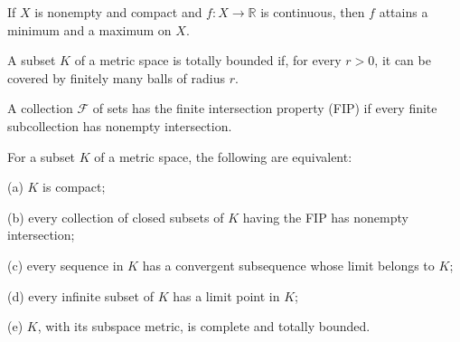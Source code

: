 \begin{cor}
If $X$ is nonempty and compact and $f:X\to\mathbb{R}$ is continuous,
then $f$ attains a minimum and a maximum on $X$.
\end{cor}

\begin{de}
A subset $K$ of a metric space is totally bounded if, for every $r>0$, it can
be covered by finitely many balls of radius $r$.

A collection $\mathcal{F}$ of sets has the finite intersection property (FIP)
if every finite subcollection has nonempty intersection.
\end{de}

\begin{thm}
For a subset $K$ of a metric space, the following are equivalent:

(a) $K$ is compact;

(b) every collection of closed subsets of $K$ having the FIP has nonempty
intersection;

(c) every sequence in $K$ has a convergent subsequence whose limit belongs to
$K$;

(d) every infinite subset of $K$ has a limit point in $K$;

(e) $K$, with its subspace metric, is complete and totally bounded.
\end{thm}

